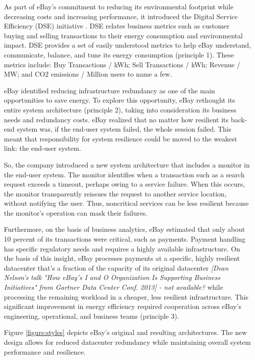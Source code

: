 As part of eBay's commitment to reducing its environmental footprint while decreasing costs and increasing performance, it introduced the Digital Service Efficiency (DSE) initiative \cite{ebay2013-digitalefficiency}. DSE relates business metrics such as customer buying and selling transactions to their energy consumption and environmental impact. DSE provides a set of easily understood metrics to help eBay understand, communicate, balance, and tune its energy consumption (principle 1). These metrics include: Buy Transactions / kWh; Sell Transactions / kWh; Revenue / MW; and CO2 emissions / Million users to name a few.

eBay identified reducing infrastructure redundancy as one of the main opportunities to save energy. To explore this opportunity, eBay rethought its entire system architecture (principle 2), taking into consideration its business needs and redundancy costs. eBay realized that no matter how resilient its back-end system was, if the end-user system failed, the whole session failed. This meant that responsibility for system resilience could be moved to the weakest link: the end-user system.

So, the company introduced a new system architecture that includes a monitor in the end-user system. The monitor identifies when a transaction such as a search request exceeds a timeout, perhaps owing to a service failure. When this occurs, the monitor transparently reissues the request to another service location, without notifying the user. Thus, noncritical services can be less resilient because the monitor's operation can mask their failures.

Furthermore, on the basis of business analytics, eBay estimated that only about 10 percent of its transactions were critical, such as payments. Payment handling has specific regulatory needs and requires a highly available infrastructure. On the basis of this insight, eBay processes payments at a specific, highly resilient datacenter that's a fraction of the capacity of its original datacenter \emph{[Dean Nelson's talk "How eBay's I and O Organization Is Supporting Business Initiatives" from Gartner Data Center Conf. 2013] - not available?} while processing the remaining workload in a cheaper, less resilient infrastructure. This significant improvement in energy efficiency required cooperation across eBay's engineering, operational, and business teams (principle 3).

Figure \ref{figure:styles} depicts eBay's original and resulting architectures. The new design allows for reduced datacenter redundancy while maintaining overall system performance and resilience.

